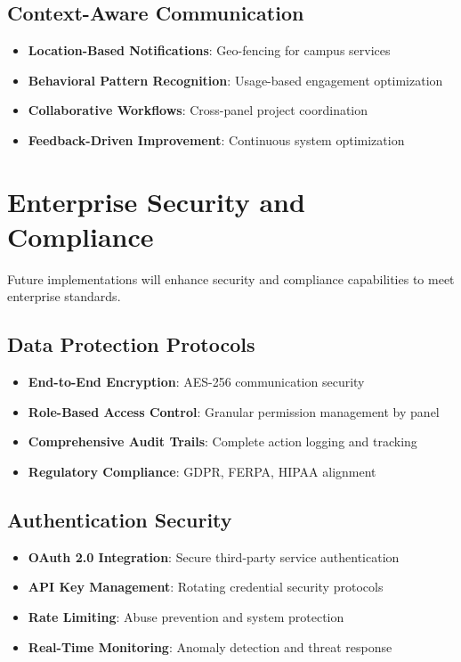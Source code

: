 \subsection{Context-Aware Communication}

\begin{itemize}
    \item \textbf{Location-Based Notifications}: Geo-fencing for campus services
    \item \textbf{Behavioral Pattern Recognition}: Usage-based engagement optimization
    \item \textbf{Collaborative Workflows}: Cross-panel project coordination
    \item \textbf{Feedback-Driven Improvement}: Continuous system optimization
\end{itemize}

\section{Enterprise Security and Compliance}

Future implementations will enhance security and compliance capabilities to meet enterprise standards.

\subsection{Data Protection Protocols}

\begin{itemize}
    \item \textbf{End-to-End Encryption}: AES-256 communication security
    \item \textbf{Role-Based Access Control}: Granular permission management by panel
    \item \textbf{Comprehensive Audit Trails}: Complete action logging and tracking
    \item \textbf{Regulatory Compliance}: GDPR, FERPA, HIPAA alignment
\end{itemize}

\subsection{Authentication Security}

\begin{itemize}
    \item \textbf{OAuth 2.0 Integration}: Secure third-party service authentication
    \item \textbf{API Key Management}: Rotating credential security protocols
    \item \textbf{Rate Limiting}: Abuse prevention and system protection
    \item \textbf{Real-Time Monitoring}: Anomaly detection and threat response
\end{itemize}

